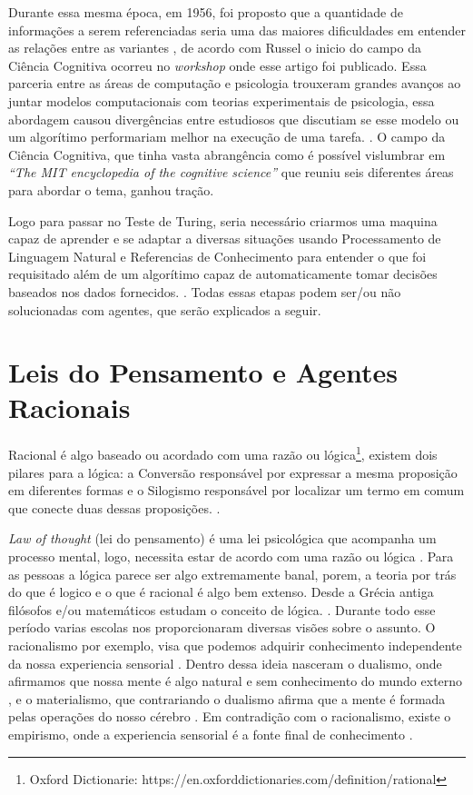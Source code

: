 \documentclass[
	12pt,				%
	openright,			%
	twoside,			%
	a4paper,			%
	english,			%
	french,				%
	spanish,			%
	brazil				%
	]{abntex2}
\begin{document}
Durante essa mesma época, em 1956, foi proposto que a quantidade de informações a serem referenciadas seria uma das maiores dificuldades em entender as relações entre as variantes \cite[81-82]{miller1956magical}, de acordo com Russel \cite[13]{russell2003artificial} o inicio do campo da Ciência Cognitiva ocorreu no \textit{workshop} onde esse artigo foi publicado. Essa parceria entre as áreas de computação e psicologia trouxeram grandes avanços ao juntar modelos computacionais com teorias experimentais de psicologia, essa abordagem causou divergências entre estudiosos que discutiam se esse modelo ou um algorítimo performariam melhor na execução de uma tarefa. \cite[3]{russell2003artificial}. O campo da Ciência Cognitiva,  que tinha vasta abrangência como é possível vislumbrar em \textit{“The MIT encyclopedia of the cognitive science”} \cite{wilson2001encyclopedia} que reuniu seis diferentes áreas para abordar o tema, ganhou tração.

Logo para passar no Teste de Turing, seria necessário criarmos uma maquina capaz de aprender e se adaptar a diversas situações usando Processamento de Linguagem Natural e Referencias de Conhecimento para entender o que foi requisitado além de um algorítimo capaz de automaticamente tomar decisões baseados nos dados fornecidos. \cite[2]{russell2003artificial}. Todas essas etapas podem ser/ou não solucionadas com agentes, que serão explicados a seguir.

\section{Leis do Pensamento e Agentes Racionais}

Racional é algo baseado ou acordado com uma razão ou lógica\footnote{Oxford Dictionarie:  https://en.oxforddictionaries.com/definition/rational}, existem dois pilares para a lógica: a Conversão responsável por expressar a mesma proposição em diferentes formas e o Silogismo responsável por localizar um termo em comum que conecte duas dessas proposições. \cite[175]{boole1854investigation}.

\textit{Law of thought} (lei do pensamento) é uma lei psicológica que acompanha um processo mental, logo, necessita estar de acordo com uma razão ou lógica \cite[289-291]{frege1956thought}. Para as pessoas a lógica parece ser algo extremamente banal, porem, a teoria por trás do que é logico e o que é racional é algo bem extenso. Desde a Grécia antiga filósofos e/ou matemáticos estudam o conceito de lógica. \cite[4-5]{russell2003artificial}. Durante todo esse período varias escolas nos proporcionaram diversas visões sobre o assunto. O racionalismo por exemplo, visa que podemos adquirir conhecimento independente da nossa experiencia sensorial \cite{rationalismvsempiricism}. Dentro dessa ideia nasceram o dualismo, onde afirmamos que nossa mente é algo natural e sem conhecimento do mundo externo \cite[7]{descartes2013rene}, e o materialismo, que contrariando o dualismo afirma que a mente é formada pelas operações do nosso cérebro \cite[6]{russell2003artificial}.
Em contradição com o racionalismo, existe o empirismo, onde a experiencia sensorial é a fonte final de conhecimento \cite{rationalismvsempiricism}.
\end{document}
